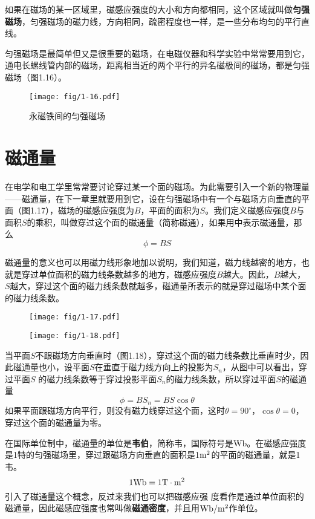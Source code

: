 如果在磁场的某一区域里，磁感应强度的大小和方向都相同，这个区域就叫做\textbf{匀强磁场}，匀强磁场的磁力线，方向相同，疏密程度也一样，是一些分布均匀的平行直线。

匀强磁场是最简单但又是很重要的磁场，在电磁仪器和科学实验中常常要用到它，通电长螺线管内部的磁场，距离相当近的两个平行的异名磁极间的磁场，都是匀强磁场（图1.16）。

\begin{figure}[htp]\centering
\texttt{[image: fig/1-16.pdf]}
\caption{永磁铁间的匀强磁场}
\end{figure}

\section{磁通量}
在电学和电工学里常常要讨论穿过某一个面的磁场。为此需要引入一个新的物理量——磁通量，在下一章里就要用到它，设在匀强磁场中有一个与磁场方向垂直的平面（图1.17），磁场的磁感应强度为$B$，平面的面积为$S$。我们定义磁感应强度$B$与面积$S$的乘积，叫做穿过这个面的磁通量（简称磁通），如果用中表示磁通量，那么
\[\phi=BS \]

磁通量的意义也可以用磁力线形象地加以说明，我们知道，磁力线越密的地方，也就是穿过单位面积的磁力线条数越多的地方，磁感应强度$B$越大。因此，$B$越大，$S$越大，穿过这个面的磁力线条数就越多，磁通量所表示的就是穿过磁场中某个面的磁力线条数。

\begin{figure}[htp]
\centering
\begin{minipage}[t]{0.48\textwidth}
\centering
\texttt{[image: fig/1-17.pdf]}
\caption{}
\end{minipage}
\begin{minipage}[t]{0.48\textwidth}
\centering
\texttt{[image: fig/1-18.pdf]}
\caption{}
\end{minipage}
\end{figure}


当平面$S$不跟磁场方向垂直时（图1.18），穿过这个面的磁力线条数比垂直时少，因此磁通量也小，设平面$S$在垂直于磁力线方向上的投影为$S_n$，从图中可以看出，穿过平面$S$
的磁力线条数等于穿过投影平面$S_n$的磁力线条数，所以穿过平面$S$的磁通量
\[\phi=BS_n=BS\cos\theta\]
如果平面跟磁场方向平行，则没有磁力线穿过这个面，这时$\theta=90^\circ$，$\cos\theta=0$，穿过这个面的磁通量为零。

在国际单位制中，磁通量的单位是\textbf{韦伯}，简称韦，国际符号是Wb。在磁感应强度是1特的匀强磁场里，穿过跟磁场方向垂直的面积是1${\rm m^2}$的平面的磁通量，就是1韦。
\[1{\rm Wb}=1{\rm T\cdot m^2}\]
引入了磁通量这个概念，反过来我们也可以把磁感应强
度看作是通过单位面积的磁通量，因此磁感应强度也常叫做\textbf{磁通密度}，并且用${\rm Wb}/{\rm m^2}$作单位。

